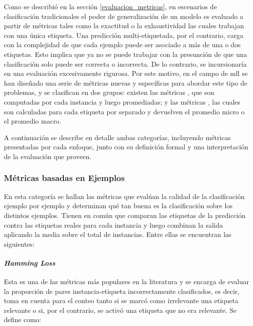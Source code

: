Como se describió en la sección \ref{evaluacion_metricas}, en escenarios de
clasificación tradicionales el poder de generalización de un modelo es evaluado
a partir de métricas tales como la exactitud o la exhaustividad las cuales
trabajan con una única etiqueta. Una predicción multi-etiquetada, por el
contrario, carga con la complejidad de que cada ejemplo puede ser asociado a más
de una o dos etiquetas. Esto implica que ya no se puede trabajar con la
presunción de que una clasificación solo puede ser correcta o incorrecta. De lo
contrario, se incursionaría en una evaluación excesivamente rigurosa. Por este
motivo, en el campo de \acrshort{mll} se han diseñado una serie de métricas
nuevas y específicas para abordar este tipo de problemas, y se clasifican en dos
grupos: existen las métricas , que son computadas
por cada instancia y luego promediadas; y las métricas , las cuales son calculadas para cada etiqueta por separado y
devuelven el promedio micro o el promedio macro. 

A continuación se describe en detalle ambas categorías, incluyendo métricas
presentadas por cada enfoque, junto con su definición formal y una
interpretación de la evaluación que proveen.

\subsubsection{Métricas basadas en Ejemplos}

En esta categoría se hallan las métricas que evalúan la calidad de la
clasificación ejemplo por ejemplo y determinan qué tan buena es la clasificación
sobre los distintos ejemplos. Tienen en común que comparan las etiquetas de la
predicción contra las etiquetas reales para cada instancia y luego combinan la
salida aplicando la media sobre el total de instancias. Entre ellas se
encuentran las siguientes:

\paragraph{\textit{Hamming Loss}}

Esta es una de las métricas más populares en la literatura y se encarga de
evaluar la proporción de pares instancia-etiqueta incorrectamente clasificados,
es decir, toma en cuenta para el conteo tanto si se marcó como irrelevante una
etiqueta relevante o si, por el contrario, se activó una etiqueta que no era
relevante. Se define como: 

